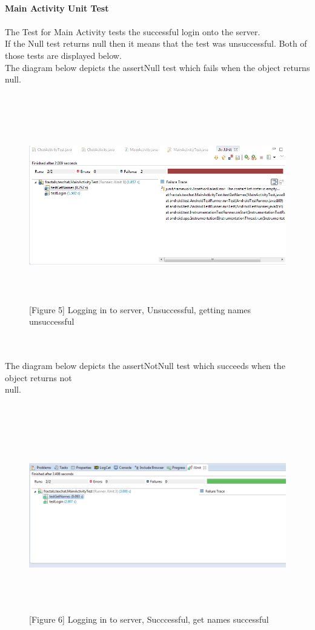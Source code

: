 \documentclass[29pt,a4paper]{moderncv}
\begin{document}
\newpage
	\\
	\textbf{Main Activity Unit Test}\\
	\\The Test for Main Activity tests the successful login onto the server.\\
	If the Null test returns null then it means that the test was unsuccessful. Both of those tests are displayed below.
	\\The diagram below depicts the assertNull test which fails when the object returns null.\\
	\\
	\begin{figure}
					
					\\ \includegraphics[width=6.0in, height=3.0in]{./loginUnsucc.png}
					\\ \caption{[Figure 5] Logging in to server, Unsuccessful, getting names unsuccessful}
	\end{figure}\\
	
\newpage	
	\\The diagram below depicts the assertNotNull test which succeeds when the object returns not \\null.\\
	\\
		
	\begin{figure}
					\\ \includegraphics[width=6.0in, height=3.0in]{./loginTestsuccess.png}
					\\\caption{[Figure 6] Logging in to server, Succcessful, get names successful}
	\end{figure}\\	
	
\end{document}
